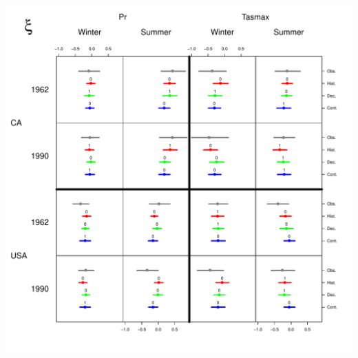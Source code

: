 \documentclass[mathserif, 11pt, t]{beamer}
\begin{document}
\begin{frame}
\begin{center}
\includegraphics[scale=0.34]{figs/shape.pdf}
\end{center}
\end{frame}
% 
% 
% 
% 
% 
% 
\end{document}
